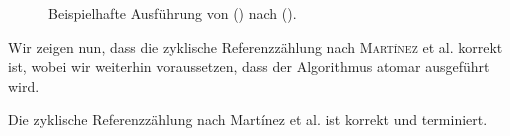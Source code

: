 \begin{figure}[h]
	\centering
	\begin{subfigure}{0.4\textwidth}
		\centering
		
	\end{subfigure}~\hspace{0.5cm}~
	\begin{subfigure}{0.4\textwidth}
		\centering
		
	\end{subfigure}\\[1cm]
	\begin{subfigure}{0.4\textwidth}
		\centering
		
	\end{subfigure}~\hspace{0.5cm}~
	\begin{subfigure}{0.4\textwidth}
		\centering
		
	\end{subfigure}\\[1cm]
	\begin{subfigure}{0.4\textwidth}
		\centering
		
	\end{subfigure}~\hspace{0.5cm}~
	\begin{subfigure}{0.4\textwidth}
		\centering
		
	\end{subfigure}
	\caption[Ausführung von ()]{Beispielhafte Ausführung von () nach ().}
	\label{fig:rc-unmark-example}
\end{figure}

Wir zeigen nun, dass die zyklische Referenzzählung nach \textsc{Martínez} et al. korrekt ist, wobei wir weiterhin voraussetzen, dass der Algorithmus atomar ausgeführt wird.

\begin{mybox}
\begin{satz}
\label{satz:cyclic-rc-correctness}
	Die zyklische Referenzzählung nach Martínez et al. ist korrekt und terminiert.
\end{satz}
\end{mybox}

